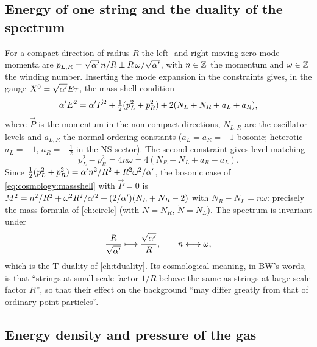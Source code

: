\subsection{Energy of one string and the duality of the spectrum}

For a compact direction of radius $R$ the left- and right-moving zero-mode momenta are
$p_{L,R}=\sqrt{\alpha'}\,n/R\pm R\,\omega/\sqrt{\alpha'}$, with $n\in\mathbb{Z}$ the momentum and $\omega\in\mathbb{Z}$
the winding number. Inserting the mode expansion in the constraints gives, in the gauge
$X^0=\sqrt{\alpha'}E\tau$, the mass-shell condition 
\begin{equation}\label{eq:cosmology:massshell}
 \alpha' E^2=\alpha'\vec P^2+\tfrac12(p_L^2+p_R^2)+2(N_L+N_R+a_L+a_R),
\end{equation}
where $\vec P$ is the momentum in the non-compact directions, $N_{L,R}$ are the oscillator
levels and $a_{L,R}$ the normal-ordering constants ($a_L=a_R=-1$ bosonic; heterotic
$a_L=-1$, $a_R=-\tfrac12$ in the NS sector). The second constraint gives level matching
\begin{equation}\label{eq:cosmology:levelmatch}
 p_L^2-p_R^2=4n\omega=4(N_R-N_L+a_R-a_L).
\end{equation}
Since $\tfrac12(p_L^2+p_R^2)=\alpha' n^2/R^2+R^2\omega^2/\alpha'$, the bosonic case of
\eqref{eq:cosmology:massshell} with $\vec P=0$ is
$M^2=n^2/R^2+\omega^2R^2/\alpha'^2+(2/\alpha')(N_L+N_R-2)$ with $N_R-N_L=n\omega$: precisely the mass
formula of \cref{ch:circle} (with $N=N_R$, $\tilde N=N_L$). The spectrum is invariant under
\begin{equation}\label{eq:cosmology:tdual}
 \frac{R}{\sqrt{\alpha'}}\longmapsto\frac{\sqrt{\alpha'}}{R},\qquad n\longleftrightarrow\omega ,
\end{equation}
which is the T-duality of \cref{ch:tduality}. Its cosmological meaning, in BW's words, is
that ``strings at small scale factor $1/R$ behave the same as strings at large scale factor
$R$'', so that their effect on the background ``may differ greatly from that of ordinary
point particles''. 

\subsection{Energy density and pressure of the gas}

